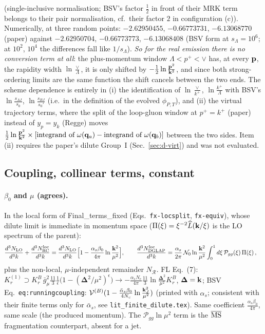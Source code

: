 (single-inclusive normalisation; BSV's factor $\frac12$ in front of their MRK term belongs to their pair normalisation, cf.\ their factor $2$ in configuration (c)). Numerically, at three random points: $-2.62950455$, $-0.66773731$, $-6.13068770$ (paper) against $-2.62950704$, $-0.66773773$, $-6.13068408$ (BSV form at $s_\Lambda=10^6$; at $10^2$, $10^4$ the differences fall like $1/s_\Lambda$). \emph{So for the real emission there is no conversion term at all}: the plus-momentum window $\Lambda<p^+<\vee$ has, at every $\mathbf{p}$, the rapidity width $\ln\frac{\vee}{\Lambda}$, it is only shifted by $-\frac12\ln\frac{\mathbf{p}^2}{\mathbf{k}^2}$, and since both strong-ordering limits are the same function the shift cancels between the two ends. The scheme dependence is entirely in (i) the identification of $\ln\frac{\vee}{k^+}$, $\ln\frac{k^+}{\Lambda}$ with BSV's $\ln\frac{s_{AJ}}{s_0}$, $\ln\frac{s_{BJ}}{s_0'}$ (i.e.\ in the definition of the evolved $\phi_{P,T}$), and (ii) the virtual trajectory terms, where the split of the loop-gluon window at $p^+=k^+$ (paper) instead of $y_p=y_k$ (Regge) moves $\frac12\ln\frac{\mathbf{p}^2}{\mathbf{k}^2}\times[\text{integrand of }\omega(\mathbf{q}_a)-\text{integrand of }\omega(\mathbf{q}_b)]$ between the two sides. Item (ii) requires the paper's dilute Group~I (Sec.~\ref{sec:d-virt}) and was not evaluated.

\subsection{Coupling, collinear terms, constant}\label{sec:d-const}
\paragraph{$\beta_0$ and $\mu$ (agrees).} In the local form of Final\_terms\_fixed (Eqs.~\texttt{fx-locsplit}, \texttt{fx-equiv}), whose dilute limit is immediate in momentum space ($\Pi(\xi)=\xi^{-2}\widehat L(\mathbf{k}/\xi)$ is the LO spectrum of the parent):
\begin{align}
\frac{d^3N_{\rm LO}}{d^3k}+\frac{d^3N^{\rm loc}_{\rm RC}}{d^3k}&=\frac{d^3N_{\rm LO}}{d^3k}\Big[1-\frac{\alpha_s\beta_0}{4\pi}\ln\frac{\mathbf{k}^2}{\mu^2}\Big],\qquad
\frac{d^3N^{\rm loc}_{\rm DGLAP}}{d^3k}=\frac{\alpha_s}{2\pi}\,\mathcal N_0\ln\frac{\mathbf{k}^2}{\mu^2}\int_0^1d\xi\,\mathcal P_{gg}(\xi)\,\Pi(\xi)\,,\label{d:RC}
\end{align}
plus the non-local, $\mu$-independent remainder $N_{\mathcal R}$. FL Eq.~(7): $K^{(1)}_r\supset K^B_r\,\bar g^2_\mu\frac{11}{3}\frac1\epsilon\big(1-(\boldsymbol\Delta^2/\mu^2)^\epsilon\big)\to-\frac{\alpha_sN_c}{4\pi}\frac{11}{3}\ln\frac{\boldsymbol\Delta^2}{\mu^2}K^B_r$, $\boldsymbol\Delta=\mathbf{k}$; BSV Eq.~\texttt{eq:runningcoupling}: $\mathcal V^{(B)}(1-\frac{\bar\alpha_s\beta_0}{4N_c}\ln\frac{\mathbf{k}_J^2}{\mu^2})$ (printed with $\alpha_s$; consistent with their finite terms only for $\bar\alpha_s$, see \texttt{lit\_finite\_dilute.tex}). Same coefficient $\frac{\alpha_s\beta_0}{4\pi}$, same scale (the produced momentum). The $\mathcal P_{gg}\ln\mu^2$ term is the $\overline{\rm MS}$ fragmentation counterpart, absent for a jet.
